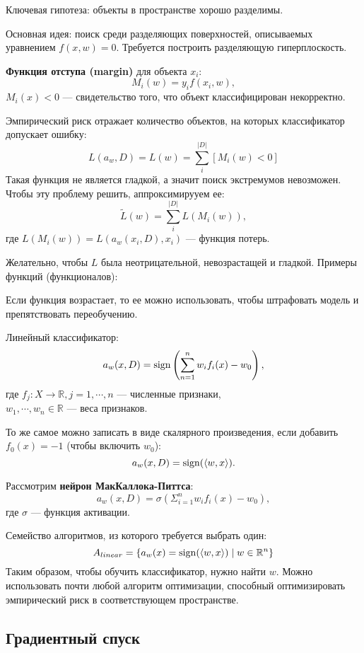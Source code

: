 Ключевая гипотеза: объекты в пространстве хорошо разделимы.

Основная идея: поиск среди разделяющих поверхностей, описываемых уравнением
$f(x, w) = 0$. Требуется построить разделяющую гиперплоскость.

\textbf{Функция отступа (margin)} для объекта $x_i$:
\[
    M_i(w) = y_i f(x_i, w),
\]
$M_i(x) < 0$ --- свидетельство того, что объект классифицирован некорректно.

Эмпирический риск отражает количество объектов, на которых классификатор
допускает ошибку:
\[
    L(a_w, D) = L(w) = \sum^{|D|}_{i}[M_i(w) < 0]
\]
Такая функция не является гладкой, а значит поиск экстремумов невозможен. Чтобы
эту проблему решить, аппроксимирууем ее:
\[
    \tilde L(w) = \sum^{|D|}_i L(M_i(w)),
\] где $L(M_i(w)) = L(a_w(x_i, D), x_i)$ --- функция потерь.

Желательно, чтобы $L$ была неотрицательной, невозрастащей и гладкой. Примеры
функций (функционалов):


Если функция возрастает, то ее можно использовать, чтобы штрафовать модель и
препятствовать переобучению.

Линейный классификатор:
\[
    a_w(x, D) = \operatorname{sign} \left( \sum^n_{n=1} w_i f_i(x) - w_0 \right),
\]
где $f_j : X \to \mathbb{R}, j = 1, \cdots, n$ --- численные признаки,\\
$w_1, \cdots, w_n \in \mathbb{R}$ --- веса признаков.

То же самое можно записать в виде скалярного произведения, если добавить
$f_0(x) = -1$ (чтобы включить $w_0$):
\[
    a_w(x, D) = \operatorname{sign}(\langle w, x \rangle).
\]

Рассмотрим \textbf{нейрон МакКаллока-Питтса}:
\[
    a_w(x, D) = \sigma \left( \Sigma^n_{i=1} w_i f_i(x) - w_0 \right),
\]
где $\sigma$ --- функция активации.


Семейство алгоритмов, из которого требуется выбрать один:
\[
    A_{linear} = \{a_w(x) = \operatorname{sign}(\langle w, x \rangle) \mid w \in \mathbb{R}^n
    \}
\]
Таким образом, чтобы обучить классификатор, нужно найти $w$. Можно использовать
почти любой алгоритм оптимизации, способный оптимизировать эмпирический риск в
соответствующем пространстве.

\subsection{Градиентный спуск}


